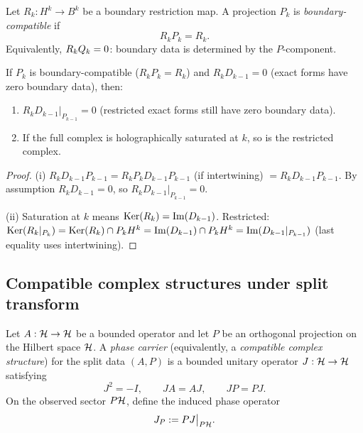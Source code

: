 \begin{definition}
\label{def:boundary-compatible}
Let $R_k : H^k \to B^k$ be a boundary restriction map.
A projection $P_k$ is \emph{boundary-compatible} if
\[
R_k P_k = R_k.
\]
Equivalently, $R_k Q_k = 0$: boundary data is determined by the $P$-component.
\end{definition}

\begin{proposition}
\label{prop:saturation-compatible}
If $P_k$ is boundary-compatible ($R_k P_k = R_k$) and $R_k D_{k-1} = 0$ (exact forms have zero boundary data), then:
\begin{enumerate}[label=(\roman*)]
\item $R_k D_{k-1}|_{P_{k-1}} = 0$ (restricted exact forms still have zero boundary data).
\item If the full complex is holographically saturated at $k$, so is the restricted complex.
\end{enumerate}
\end{proposition}

\begin{proof}
(i) $R_k D_{k-1} P_{k-1} = R_k P_k D_{k-1} P_{k-1}$ (if intertwining) $= R_k D_{k-1} P_{k-1}$.
By assumption $R_k D_{k-1} = 0$, so $R_k D_{k-1}|_{P_{k-1}} = 0$.

(ii) Saturation at $k$ means $\mathrm{Ker}(R_k) = \mathrm{Im}(D_{k-1})$.
Restricted: $\mathrm{Ker}(R_k|_{P_k}) = \mathrm{Ker}(R_k) \cap P_k H^k = \mathrm{Im}(D_{k-1}) \cap P_k H^k = \mathrm{Im}(D_{k-1}|_{P_{k-1}})$ (last equality uses intertwining).
\end{proof}

\subsection{Compatible complex structures under split transform}
\label{subsec:compatible-complex-structures}

\begin{definition}
\label{def:phase-carrier}
Let $A:\mathcal{H}\to\mathcal{H}$ be a bounded operator and let $P$ be an orthogonal projection
on the Hilbert space $\mathcal{H}$. A \emph{phase carrier} (equivalently, a
\emph{compatible complex structure}) for the split data $(A,P)$ is a bounded
unitary operator $J:\mathcal{H}\to\mathcal{H}$ satisfying
\[
J^2=-I,
\qquad
JA=AJ,
\qquad
JP=PJ.
\]
On the observed sector $P\mathcal{H}$, define the induced phase operator
\[
J_P:=PJ\big|_{P\mathcal{H}}.
\]
\end{definition}

